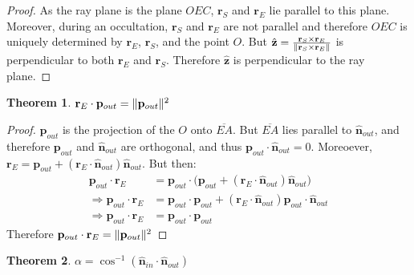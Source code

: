 \documentclass{article}
\theoremstyle{mystyle}
\newtheorem{theorem}{Theorem}[section]
\DeclarePairedDelimiter\norm{\lVert}{\rVert}
\begin{document}
\begin{proof}
As the ray plane is the plane $OEC$, $\mathbf{r}_{S}$ and $\mathbf{r}_{E}$ lie parallel to this plane. Moreover, during an occultation, $\mathbf{r}_{S}$ and $\mathbf{r}_{E}$ are not parallel and therefore $OEC$ is uniquely determined by $\mathbf{r}_{E}$, $\mathbf{r}_{S}$, and the point $O$. But $\hat{\mathbf{z}} = \frac{\mathbf{r}_{S}\times \mathbf{r}_{E}}{\norm{\mathbf{r}_{S}\times \mathbf{r}_{E}}}$ is perpendicular to both $\mathbf{r}_{E}$ and $\mathbf{r}_{S}$. Therefore $\hat{\mathbf{z}}$ is perpendicular to the ray plane.
\end{proof}
\begin{theorem}
\label{theorem:r_e_dot_p_out_equal_p_out_square}
$\mathbf{r}_{E}\cdot \mathbf{p}_{out} = \norm{\mathbf{p}_{out}}^2$
\end{theorem}
\begin{proof}
$\mathbf{p}_{out}$ is the projection of the $O$ onto $\overline{EA}$. But $\overline{EA}$ lies parallel to $\hat{\mathbf{n}}_{out}$, and therefore $\mathbf{p}_{out}$ and $\hat{\mathbf{n}}_{out}$ are orthogonal, and thus $\mathbf{p}_{out}\cdot\hat{\mathbf{n}}_{out}=0$. Moreoever, $\mathbf{r}_{E} = \mathbf{p}_{out}+(\mathbf{r}_{E}\cdot \hat{\mathbf{n}}_{out}) \hat{\mathbf{n}}_{out}$. But then:
\begin{align*}
    \mathbf{p}_{out}\cdot \mathbf{r}_{E} &= \mathbf{p}_{out}\cdot\big(\mathbf{p}_{out}+(\mathbf{r}_{E}\cdot \hat{\mathbf{n}}_{out})\hat{\mathbf{n}}_{out}\big)\\
    \Rightarrow \mathbf{p}_{out}\cdot \mathbf{r}_{E} &= \mathbf{p}_{out}\cdot \mathbf{p}_{out} + (\mathbf{r}_{E}\cdot \hat{\mathbf{n}}_{out}) \mathbf{p}_{out}\cdot \hat{\mathbf{n}}_{out}\\
    \Rightarrow \mathbf{p}_{out}\cdot \mathbf{r}_{E} &= \mathbf{p}_{out}\cdot \mathbf{p}_{out}
\end{align*}
Therefore $\mathbf{p}_{out}\cdot \mathbf{r}_{E} = \norm{\mathbf{p}_{out}}^2$
\end{proof}
\begin{theorem}
$\alpha = \cos^{-1}(\hat{\mathbf{n}}_{in}\cdot \hat{\mathbf{n}}_{out})$
\end{theorem}
\end{document}
